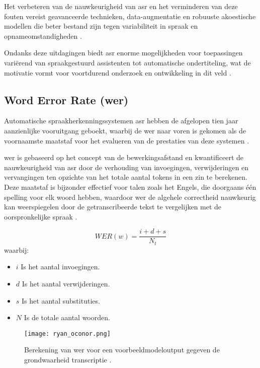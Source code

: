 Het verbeteren van de nauwkeurigheid van \gls{asr} en het verminderen van deze fouten vereist geavanceerde technieken, data-augmentatie en robuuste akoestische modellen die beter bestand zijn tegen variabiliteit in spraak en opnameomstandigheden \autocite{Errattahi_2018}.

Ondanks deze uitdagingen biedt \gls{asr} enorme mogelijkheden voor toepassingen variërend van spraakgestuurd assistenten tot automatische ondertiteling, wat de motivatie vormt voor voortdurend onderzoek en ontwikkeling in dit veld \autocite{Errattahi_2018}.

\subsection{Word Error Rate (\gls{wer})}
Automatische spraakherkenningssystemen \gls{asr} hebben de afgelopen tien jaar aanzienlijke vooruitgang geboekt, waarbij de \gls{wer} naar voren is gekomen als de voornaamste maatstaf voor het evalueren van de prestaties van deze systemen \autocite{Raghavan2022}.

\gls{wer} is gebaseerd op het concept van de bewerkingsafstand en kwantificeert de nauwkeurigheid van \gls{asr} door de verhouding van invoegingen, verwijderingen en vervangingen ten opzichte van het totale aantal tokens in een zin te berekenen. Deze maatstaf is bijzonder effectief voor talen zoals het Engels, die doorgaans één spelling voor elk woord hebben, waardoor \gls{wer} de algehele correctheid nauwkeurig kan weerspiegelen door de getranscribeerde tekst te vergelijken met de oorspronkelijke spraak \autocite{Raghavan2022}.



\begin{equation}
    WER(w) = \frac{i + d + s}{N_t}
\end{equation}
waarbij:
\begin{itemize}
    \item \(i\) Is het aantal invoegingen.
    \item \(d\) Is het aantal verwijderingen.
    \item \(s\) Is het aantal substituties.
    \item \(N\) Is de totale aantal woorden.
\end{itemize}

\begin{figure}[h]
    \centering
    \texttt{[image: ryan\_oconor.png]}
    \captionsetup{justification=centering}
    \caption{Berekening van \gls{wer} voor een voorbeeldmodeloutput gegeven de grondwaarheid transcriptie \autocite{OConnor2023}.}
    \label{fig:voorbeeld}
\end{figure}

